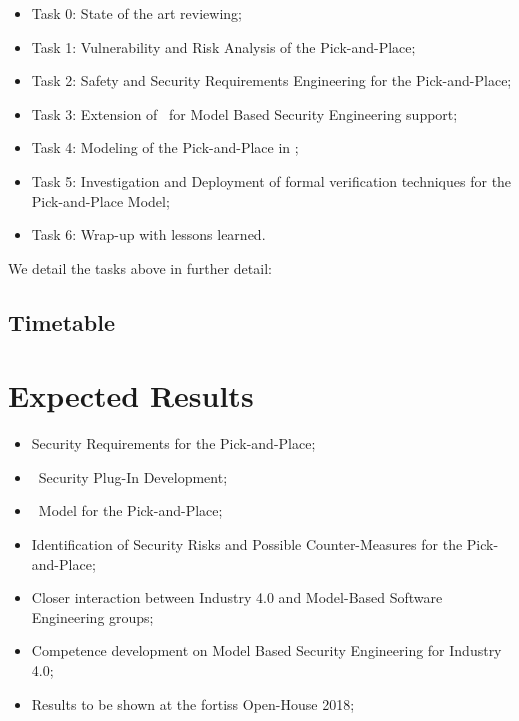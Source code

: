 \begin{itemize}
  \item Task 0: State of the art reviewing;
  \item Task 1: Vulnerability and Risk Analysis of the Pick-and-Place;  
  \item Task 2: Safety and Security Requirements Engineering for the Pick-and-Place; 
  \item Task 3: Extension of \autofocus\ for Model Based Security Engineering support;
  \item Task 4: Modeling of the Pick-and-Place in \autofocus;
  \item Task 5: Investigation and Deployment of formal verification techniques for the Pick-and-Place Model;
  \item Task 6: Wrap-up with lessons learned.
\end{itemize}

We detail the tasks above in further detail:

\subsection{Timetable}


\section{Expected Results} 

\begin{itemize}
  \item Security Requirements for the Pick-and-Place;
  \item \autofocus\ Security Plug-In Development;
  \item \autofocus\ Model for the Pick-and-Place;
  \item Identification of Security Risks and Possible Counter-Measures for the Pick-and-Place;
  \item Closer interaction between Industry 4.0 and Model-Based Software Engineering groups;
  \item Competence development on Model Based Security Engineering for Industry 4.0;
  \item Results to be shown at the fortiss Open-House 2018;
\end{itemize}

 


